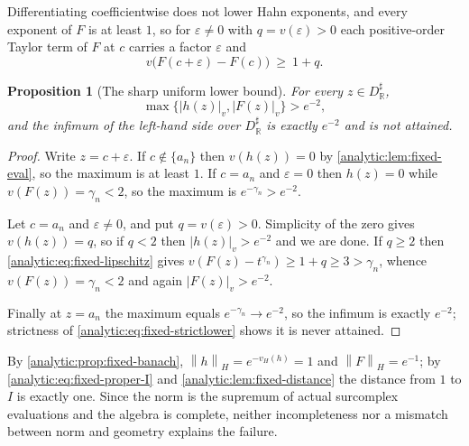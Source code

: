 \documentclass[11pt,letterpaper]{article}
\newtheorem{proposition}[theorem]{Proposition}
\theoremstyle{definition}
\theoremstyle{remark}
\newcommand{\R}{\mathbb R}
\newcommand{\norm}[1]{\left\lVert#1\right\rVert}
\newcommand{\vH}{v_{\!H}}
\numberwithin{equation}{section}
\begin{document}
Differentiating coefficientwise does not lower Hahn exponents, and every
exponent of $F$ is at least $1$, so for $\varepsilon\ne0$ with
$q=v(\varepsilon)>0$ each positive-order Taylor term of $F$ at $c$ carries
a factor $\varepsilon$ and
\begin{equation}\label{analytic:eq:fixed-lipschitz}
 v\bigl(F(c+\varepsilon)-F(c)\bigr)\ \ge\ 1+q .
\end{equation}

\begin{proposition}[The sharp uniform lower bound]
\label{analytic:prop:fixed-sharp-corona}
For every $z\in D^\sharp_\R$,
\begin{equation}\label{analytic:eq:fixed-strictlower}
 \max\{|h(z)|_v,|F(z)|_v\}>e^{-2},
\end{equation}
and the infimum of the left-hand side over $D^\sharp_\R$ is exactly
$e^{-2}$ and is not attained.
\end{proposition}
\begin{proof}
Write $z=c+\varepsilon$. If $c\notin\{a_n\}$ then $v(h(z))=0$ by
\cref{analytic:lem:fixed-eval}, so the maximum is at least $1$. If $c=a_n$
and $\varepsilon=0$ then $h(z)=0$ while $v(F(z))=\gamma_n<2$, so the
maximum is $e^{-\gamma_n}>e^{-2}$.

Let $c=a_n$ and $\varepsilon\ne0$, and put $q=v(\varepsilon)>0$.
Simplicity of the zero gives $v(h(z))=q$, so if $q<2$ then
$|h(z)|_v>e^{-2}$ and we are done. If $q\ge2$ then
\eqref{analytic:eq:fixed-lipschitz} gives
$v(F(z)-t^{\gamma_n})\ge1+q\ge3>\gamma_n$, whence $v(F(z))=\gamma_n<2$ and
again $|F(z)|_v>e^{-2}$.

Finally at $z=a_n$ the maximum equals $e^{-\gamma_n}\to e^{-2}$, so the
infimum is exactly $e^{-2}$; strictness of
\eqref{analytic:eq:fixed-strictlower} shows it is never attained.
\end{proof}

By \cref{analytic:prop:fixed-banach}, $\norm h_H=e^{-\vH(h)}=1$ and
$\norm F_H=e^{-1}$; by \eqref{analytic:eq:fixed-proper-I} and
\cref{analytic:lem:fixed-distance} the distance from $1$ to $I$ is exactly
one. Since the norm is the supremum of actual surcomplex evaluations and
the algebra is complete, neither incompleteness nor a mismatch between norm
and geometry explains the failure.
\end{document}
